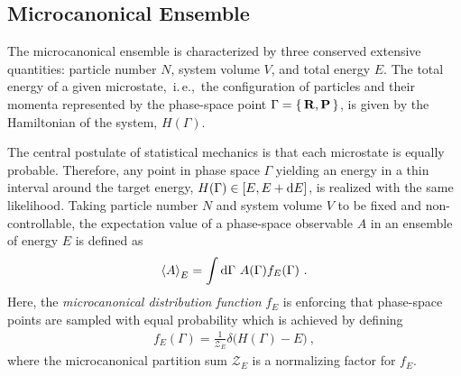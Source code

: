 \subsection{Microcanonical Ensemble}
The microcanonical ensemble is characterized by three conserved extensive quantities: particle number $N$, system volume $V$, and total energy $E$. The total energy of a given microstate,~i.\,e.,~the configuration of particles and their momenta represented by the phase-space point $\Gamma = \set{{\bf R}, {\bf P}}$, is given by the Hamiltonian of the system, $H (\Gamma)$. 

The central postulate of statistical mechanics is that each microstate is equally probable. Therefore, any point in phase space $\Gamma$ yielding an energy in a thin interval around the target energy, $H (\Gamma) \in [E, E + {\rm d} E]$, is realized with the same likelihood. Taking particle number $N$ and system volume $V$ to be fixed and non-controllable, the expectation value of a phase-space observable $A$ in an ensemble of energy $E$ is defined as
\begin{align}
	\braket{A}_E 
		= \int \d \Gamma ~ A(\Gamma) f_E (\Gamma)~.
	\label{eq:phase.space.expectation}
\end{align}
Here, the \emph{microcanonical distribution function} $f_E$ is enforcing that phase-space points are sampled with equal probability which is achieved by defining
\begin{align}
f_E (\Gamma) = \frac{1}{\mathcal{Z}_E} \delta {\bm (} H (\Gamma) - E {\bm )}~,
\end{align}
where the microcanonical partition sum $\mathcal{Z}_E$ is a normalizing factor for $f_E$.

